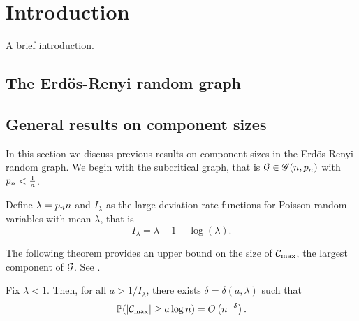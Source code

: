 
\chapter{Introduction}

A brief introduction.
\lipsum[100]

\section{The Erdös-Renyi random graph}

\section{General results on component sizes}

In this section we discuss previous results on component sizes in the Erdös-Renyi random graph.
We begin with the subcritical graph, that is
$\mathcal{G} \in \mathscr{G}(n, p_n)$ with $p_n < \frac{1}{n}$.

Define $\lambda = p_n n$ and $I_{\lambda}$ as the large deviation rate functions for Poisson random variables with mean $\lambda$,
that is
\begin{equation}
	I_{\lambda} = \lambda - 1 - \log(\lambda).
\end{equation}

The following theorem provides an upper bound on the size of $\mathcal{C}_{\max}$, the largest component of $\mathcal{G}$.
See \cite[Theorem 4.4, p.125]{vanderHofstad.2016}.
\begin{theorem}
	Fix $\lambda < 1$. 
	Then, for all $a > 1/I_{\lambda}$, 
	there exists $\delta = \delta(a, \lambda)$ such that
	\begin{equation}
		\mathbb{P}( |\mathcal{C}_{\max}| \geq a \log n ) = O\left(n^{-\delta}\right).
	\end{equation}
\end{theorem}

